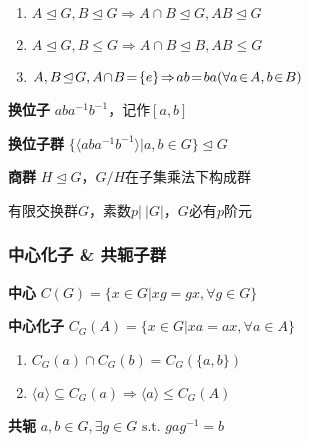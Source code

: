 \documentclass[a4paper,10pt]{ctexart}
\newcommand*{\st}{\text{ s.t. }}
\newcommand*{\impl}{\Rightarrow}
\renewcommand*{\leq}{\leqslant}
\newcommand*{\nmsubgroupeq}{\trianglelefteq}
\newcommand*{\gengroup}[1]{\langle #1 \rangle}
\begin{document}
\begin{multicols}{3}
    \begin{theorem}[正规子群运算律]
        \hfil

        \begin{enumerate}
            \item $A \!\nmsubgroupeq\! G, B \!\nmsubgroupeq\! G \!\impl\! A \!\cap\! B \!\nmsubgroupeq\! G, AB \!\nmsubgroupeq\! G$
            \item $A \!\nmsubgroupeq\! G, B \!\leq\! G \!\impl\! A \!\cap\! B \!\nmsubgroupeq\! B, AB \!\leq\! G$
            \item $A, B \!\nmsubgroupeq\! G, A \!\cap\! B \! = \! \{e\} \!\impl\! ab \! = \! ba \\ (\forall a \!\in\! A, b \!\in\! B)$
        \end{enumerate}
    \end{theorem}

    \textbf{换位子} $aba^{-1}b^{-1}$，记作$[a,b]$

    \textbf{换位子群} $\{ \gengroup{aba^{-1}b^{-1}} | a, b \in G \} \nmsubgroupeq G$

    \textbf{商群} $H \!\nmsubgroupeq\! G$，$G/H$在子集乘法下构成群

    \begin{theorem}[素阶元]
        有限交换群$G$，素数$p|\ |G|$，$G$必有$p$阶元
    \end{theorem}

    \subsubsection{中心化子 \& 共轭子群}

    \textbf{中心} $C(G) = \{ x \in G | xg = gx, \forall g \in G\}$

    \textbf{中心化子} $C_G(A) \! = \! \{x \!\in\! G | xa \! = \! ax, \forall a \!\in\! A\}$

    \begin{theorem}[中心化子性质]
        \hfil

        \begin{enumerate}
            \item $C_G(a) \cap C_G(b) = C_G(\{a, b\})$
            \item $\gengroup{a} \subseteq C_G(a) \impl \gengroup{a} \leq C_G(A)$
        \end{enumerate}
    \end{theorem}

    \textbf{共轭} $a, b \in G, \exists g \in G \st gag^{-1}=b$


\end{multicols}
\end{document}
